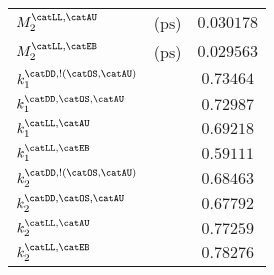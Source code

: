 \begin{table}[h]
\begin{tabular}[t]{llr@{$\,\pm\,$}l}
  $M_2^\text{\catLL,\catAU}$                     & ($\si{\pico\second}$) & \multicolumn{2}{c}{$0.030178$}\\
  $M_2^\text{\catLL,\catEB}$                     & ($\si{\pico\second}$) & \multicolumn{2}{c}{$0.029563$}\\
  $k_1^\text{\catDD,!(\catOS,\catAU)}$           &                       & \multicolumn{2}{c}{$0.73464$}\\
  $k_1^\text{\catDD,\catOS,\catAU}$              &                       & \multicolumn{2}{c}{$0.72987$}\\
  $k_1^\text{\catLL,\catAU}$                     &                       & \multicolumn{2}{c}{$0.69218$}\\
  $k_1^\text{\catLL,\catEB}$                     &                       & \multicolumn{2}{c}{$0.59111$}\\
  $k_2^\text{\catDD,!(\catOS,\catAU)}$           &                       & \multicolumn{2}{c}{$0.68463$}\\
  $k_2^\text{\catDD,\catOS,\catAU}$              &                       & \multicolumn{2}{c}{$0.67792$}\\
  $k_2^\text{\catLL,\catAU}$                     &                       & \multicolumn{2}{c}{$0.77259$}\\
  $k_2^\text{\catLL,\catEB}$                     &                       & \multicolumn{2}{c}{$0.78276$}\\
  \bottomrule
\end{tabular}
\end{table}
%
